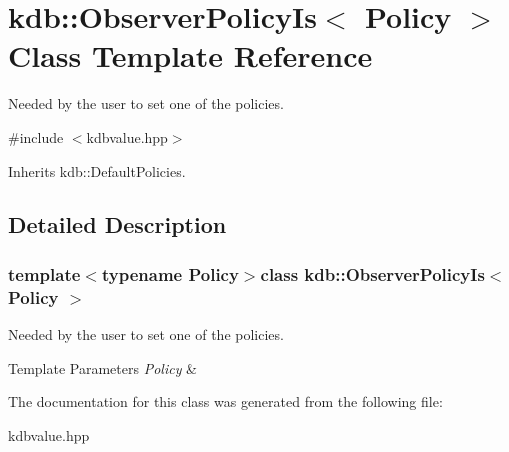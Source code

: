 \hypertarget{classkdb_1_1ObserverPolicyIs}{\section{kdb\+:\+:Observer\+Policy\+Is$<$ Policy $>$ Class Template Reference}
\label{classkdb_1_1ObserverPolicyIs}
}


Needed by the user to set one of the policies.  




{\ttfamily \#include $<$kdbvalue.\+hpp$>$}



Inherits kdb\+::\+Default\+Policies.



\subsection{Detailed Description}
\subsubsection*{template$<$typename Policy$>$class kdb\+::\+Observer\+Policy\+Is$<$ Policy $>$}

Needed by the user to set one of the policies. 


\begin{DoxyTemplParams}{Template Parameters}
{\em Policy} & \\
\hline
\end{DoxyTemplParams}


The documentation for this class was generated from the following file\+:\begin{DoxyCompactItemize}
\item 
kdbvalue.\+hpp\end{DoxyCompactItemize}
